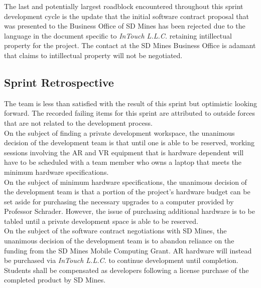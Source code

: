         The last and potentially largest roadblock encountered throughout this sprint development cycle is the 
        update that the initial software contract proposal that was presented to the Business Office of SD Mines
        has been rejected due to the language in the document specific to 
        \textit{InTouch L.L.C.} 
        retaining intillectual property for the project.  The contact at the SD Mines Business Office is adamant that 
        claims to intillectual property will not be negotiated.

    \subsection{Sprint Retrospective}
    \label{sec:Sprint2_retrospective}
        \hspace{7mm}
        The team is less than satisfied with the result of this sprint but optimistic looking forward.  The
        recorded failing items for this sprint are attributed to outside forces that are not related to the 
        development process.\\

        On the subject of finding a private development workspace, the unanimous decision of the development team is
        that until one is able to be reserved, working sessions involving the AR and VR equipment that is hardware
        dependent will have to be scheduled with a team member who owns a laptop that meets the minimum hardware
        specifications.\\

        On the subject of minimum hardware specifications, the unanimous decision of the development team is that a 
        portion of the project's hardware budget can be set aside for purchasing the necessary upgrades to a computer
        provided by Professor Schrader.  However, the issue of purchasing additional hardware is to be tabled until a
        private development space is able to be reserved.\\

        On the subject of the software contract negotiations with SD Mines, the unanimous decision of the development 
        team is to abandon reliance on the funding from the SD Mines Mobile Computing Grant.  AR hardware will instead 
        be purchased via 
        \textit{InTouch L.L.C.}
        to continue development until completion.  Students shall be compensated as developers following a
        license purchase of the completed product by SD Mines.